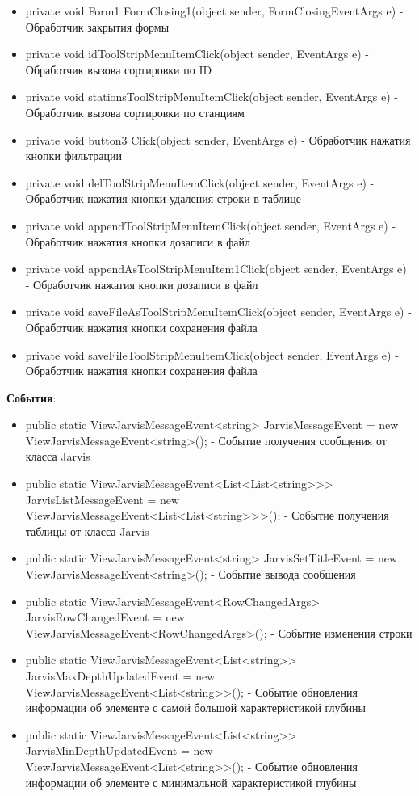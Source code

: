 \documentclass[a4paper,12pt, fleqn]{article}
\theoremstyle{plain} %
\theoremstyle{definition} %
\theoremstyle{remark} %
\numberwithin{equation}{section}
\begin{document}
\begin{itemize}
\item private void Form1 FormClosing1(object sender, FormClosingEventArgs e) - Обработчик закрытия формы
\item private void idToolStripMenuItemClick(object sender, EventArgs e) - Обработчик вызова сортировки по ID
\item private void stationsToolStripMenuItemClick(object sender, EventArgs e) - Обработчик вызова сортировки по станциям
\item private void button3 Click(object sender, EventArgs e) - Обработчик нажатия кнопки фильтрации
\item private void delToolStripMenuItemClick(object sender, EventArgs e) - Обработчик нажатия кнопки удаления строки в таблице
\item private void appendToolStripMenuItemClick(object sender, EventArgs e) - Обработчик нажатия кнопки дозаписи в файл
\item private void appendAsToolStripMenuItem1Click(object sender, EventArgs e) - Обработчик нажатия кнопки дозаписи в файл
\item private void saveFileAsToolStripMenuItemClick(object sender, EventArgs e) - Обработчик нажатия кнопки сохранения файла
\item private void saveFileToolStripMenuItemClick(object sender, EventArgs e) - Обработчик нажатия кнопки сохранения файла
\end{itemize}

\textbf{События}:
\begin{itemize}
	\item public static ViewJarvisMessageEvent<string> JarvisMessageEvent = new\\ ViewJarvisMessageEvent<string>(); - Событие получения сообщения от класса Jarvis
	\item public static ViewJarvisMessageEvent<List<List<string>>> JarvisListMessageEvent = new ViewJarvisMessageEvent<List<List<string>>>(); - Событие получения таблицы от класса Jarvis
	\item public static ViewJarvisMessageEvent<string> JarvisSetTitleEvent = new\\ ViewJarvisMessageEvent<string>(); - Событие вывода сообщения
	\item public static ViewJarvisMessageEvent<RowChangedArgs> JarvisRowChangedEvent = new ViewJarvisMessageEvent<RowChangedArgs>(); - Событие изменения строки
	\item public static ViewJarvisMessageEvent<List<string>> JarvisMaxDepthUpdatedEvent = new ViewJarvisMessageEvent<List<string>>(); - Событие обновления информации об элементе с самой большой характеристикой глубины
	\item public static ViewJarvisMessageEvent<List<string>> JarvisMinDepthUpdatedEvent = new ViewJarvisMessageEvent<List<string>>(); - Событие обновления информации об элементе с минимальной характеристикой глубины
\end{itemize}
\end{document}
